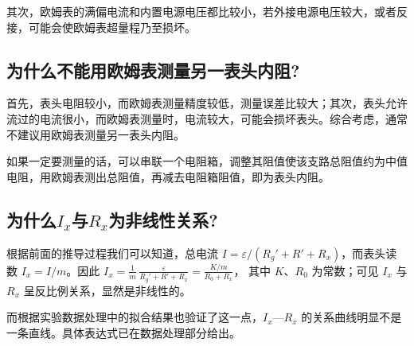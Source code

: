 \documentclass[]{../template/Report}%
\begin{document}
\begin{fullreportonly}
    其次，欧姆表的满偏电流和内置电源电压都比较小，若外接电源电压较大，或者反接，可能会使欧姆表超量程乃至损坏。
    \subsection{为什么不能用欧姆表测量另一表头内阻?}

    首先，表头电阻较小，而欧姆表测量精度较低，测量误差比较大；其次，表头允许流过的电流很小，而欧姆表测量时，电流较大，可能会损坏表头。综合考虑，通常不建议用欧姆表测量另一表头内阻。

    如果一定要测量的话，可以串联一个电阻箱，调整其阻值使该支路总阻值约为中值电阻，用欧姆表测出总阻值，再减去电阻箱阻值，即为表头内阻。

    \subsection{为什么$I_x$与$R_x$为非线性关系?}
    根据前面的推导过程我们可以知道，总电流 $I=\varepsilon/(R_g'+R'+R_x)$，而表头读数 $I_x=I/m$。因此
    $I_x = \frac{1}{m}\,\frac{\varepsilon}{R_g' + R' + R_x} = \frac{K/m}{R_0+R_x}$，
    其中 $K$、$R_0$ 为常数；可见 $I_x$ 与 $R_x$ 呈反比例关系，显然是非线性的。

    而根据实验数据处理中的拟合结果也验证了这一点，$I_x$—$R_x$ 的关系曲线明显不是一条直线。具体表达式已在数据处理部分给出。
\end{fullreportonly}
\insertnotes
\end{document}
